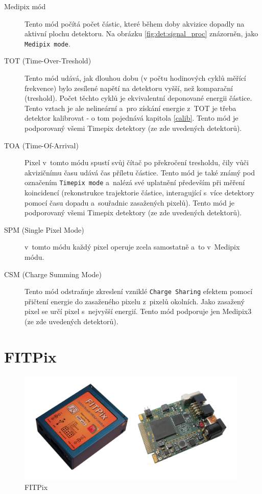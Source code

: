 \begin{description}
	\item[Medipix mód] Tento mód počítá počet částic, které během doby akvizice dopadly na aktivní plochu detektoru. Na obrázku \ref{fig:det:signal_proc} znázorněn, jako \texttt{Medipix mode}.
	\item[TOT (Time-Over-Treshold)] Tento mód udává, jak dlouhou dobu (v počtu hodinových cyklů měřící frekvence) bylo zesílené napětí na detektoru vyšší, než komparační (treshold). Počet těchto cyklů je ekvivalentní deponované energii částice. Tento vztach je ale nelineární a~pro získání energie z~TOT je třeba detektor kalibrovat - o tom pojednává kapitola \ref{calib}. Tento mód je podporovaný všemi Timepix detektory (ze zde uvedených detektorů).
	\item[TOA (Time-Of-Arrival)] Pixel v~tomto módu spustí svůj čítač po překročení tresholdu, čily vůči akvizičnímu času udává čas příletu částice. Tento mód je také známý pod označením \texttt{Timepix mode} a~nalézá své uplatnění především při měření koincidencí (rekonstrukce trajektorie částice, interagující s~více detektory pomocí času dopadu a~souřadnic zasažených pixelů). Tento mód je podporovaný všemi Timepix detektory (ze zde uvedených detektorů).
	\item[SPM (Single Pixel Mode)] v~tomto módu každý pixel operuje zcela samostatně a~to v~Medipix módu.
	\item[CSM (Charge Summing Mode)]\label{det:mod:csm} Tento mód odstraňuje zkreslení vzniklé \texttt{Charge Sharing} efektem pomocí přičtení energie do zasaženého pixelu z~pixelů okolních. Jako zasažený pixel se určí pixel s~nejvyšší energií. Tento mód podporuje jen Medipix3 (ze zde uvedených detektorů).

\end{description}

\section{FITPix}\label{det:fitpix}

\begin{figure}[th!]
	\begin{center}
		\includegraphics[width=11cm]{figures/fitpix.png}
		\caption{FITPix}
		\label{fig:det:fitpix}
	\end{center}
\end{figure}


